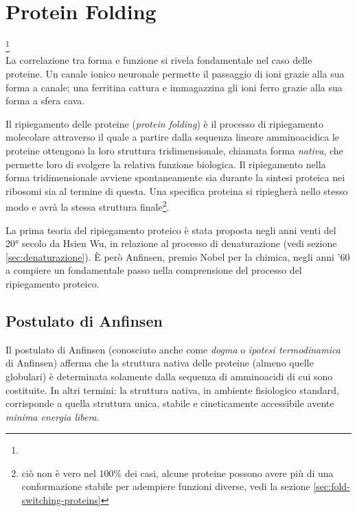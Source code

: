 \chapter{Protein Folding}

\footnote{}\\

La correlazione tra forma e funzione si rivela fondamentale nel caso delle proteine. Un canale ionico neuronale permette il passaggio di ioni grazie alla sua forma a canale; una ferritina cattura e immagazzina gli ioni ferro grazie alla sua forma a sfera cava. 

\par Il ripiegamento delle proteine (\textit{protein folding}) è il processo di ripiegamento molecolare attraverso il quale a partire dalla sequenza lineare amminoacidica le proteine ottengono la loro struttura tridimensionale, chiamata forma \textit{nativa}, che permette loro di svolgere la relativa funzione biologica. Il ripiegamento nella forma tridimensionale avviene spontaneamente sia durante la sintesi proteica nei ribosomi sia al termine di questa. Una specifica proteina si ripiegherà nello stesso modo e avrà la stessa struttura finale\footnote{ciò non è vero nel 100\% dei casi, alcune proteine possono avere più di una conformazione stabile per adempiere funzioni diverse, vedi la sezione \ref{sec:fold-switching-proteins}}.

\par La prima teoria del ripiegamento proteico è stata proposta negli anni venti del 20° secolo da Hsien Wu\supercite{wu1931studies}, in relazione al processo di denaturazione (vedi sezione \ref{sec:denaturazione}). È però Anfinsen, premio Nobel per la chimica, negli anni '60 a compiere un fondamentale passo nella comprensione del processo del ripiegamento proteico\supercite{anfinsen1972formation}. 


\section{Postulato di Anfinsen}
Il postulato di Anfinsen (conosciuto anche come \textit{dogma} o \textit{ipotesi termodinamica} di Anfinsen) afferma che la struttura nativa delle proteine (almeno quelle globulari) è determinata solamente dalla sequenza di amminoacidi di cui sono costituite. In altri termini: la struttura nativa, in ambiente fisiologico standard, corrisponde a quella struttura unica, stabile e cineticamente accessibile avente \textit{minima energia libera}. 

